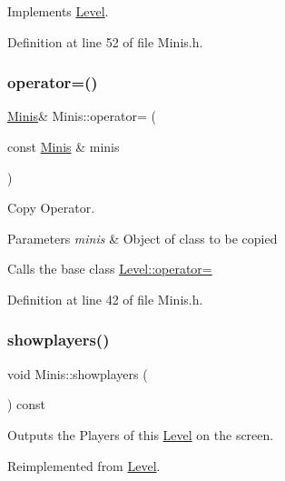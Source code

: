 Implements \hyperlink{class_level_a161cf8c238fd499c112d90504cb6f587}{Level}.



Definition at line 52 of file Minis.\+h.

\hypertarget{class_minis_a25cdc8631f19c04d7ddd16507a4bc48c}{}\label{class_minis_a25cdc8631f19c04d7ddd16507a4bc48c} 
\subsubsection{\texorpdfstring{operator=()}{operator=()}}
{\footnotesize\ttfamily \hyperlink{class_minis}{Minis}\& Minis\+::operator= (\begin{DoxyParamCaption}\item[{const \hyperlink{class_minis}{Minis} \&}]{minis }\end{DoxyParamCaption})\hspace{0.3cm}{\ttfamily [inline]}}



Copy Operator. 


\begin{DoxyParams}{Parameters}
{\em minis} & Object of class to be copied\\
\hline
\end{DoxyParams}
Calls the base class \hyperlink{class_level_a60eb04b65c900ae8dddf3d6251fac7b1}{Level\+::operator=} 

Definition at line 42 of file Minis.\+h.

\hypertarget{class_minis_a062ba8858c80dcf52c792e5304ccbfeb}{}\label{class_minis_a062ba8858c80dcf52c792e5304ccbfeb} 
\subsubsection{\texorpdfstring{showplayers()}{showplayers()}}
{\footnotesize\ttfamily void Minis\+::showplayers (\begin{DoxyParamCaption}{ }\end{DoxyParamCaption}) const\hspace{0.3cm}{\ttfamily [virtual]}}



Outputs the Players of this \hyperlink{class_level}{Level} on the screen. 



Reimplemented from \hyperlink{class_level_a40d22b376e72950a07de5e0a9e288029}{Level}.



